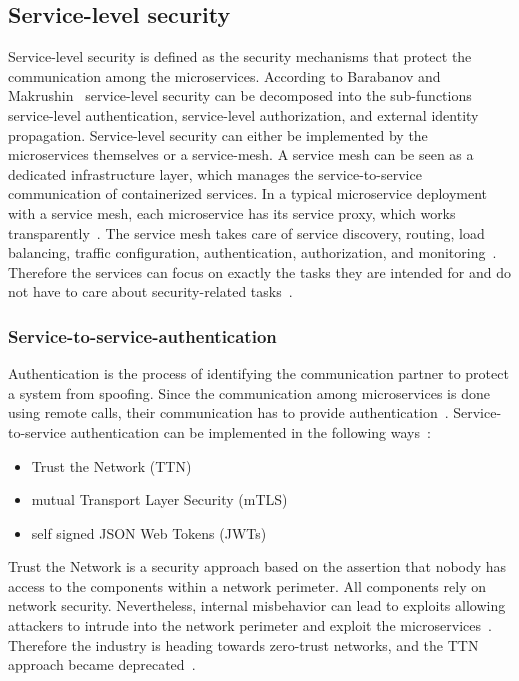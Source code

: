 \subsection{Service-level security}
Service-level security is defined as the security mechanisms that protect the communication among the microservices.
According to Barabanov and Makrushin~\cite{barabanov2020authentication} service-level security can be decomposed into the sub-functions service-level authentication, service-level authorization, and external identity propagation.
Service-level security can either be implemented by the microservices themselves or a service-mesh.
A service mesh can be seen as a dedicated infrastructure layer, which manages the service-to-service communication of containerized services.
In a typical microservice deployment with a service mesh, each microservice has its service proxy, which works transparently~\cite{dias2020microservices}.
The service mesh takes care of service discovery, routing, load balancing, traffic configuration, authentication, authorization, and monitoring~\cite{chandramouli2019microservices}.
Therefore the services can focus on exactly the tasks they are intended for and do not have to care about security-related tasks~\cite{dias2020microservices}.

\subsubsection{Service-to-service-authentication} 
\label{sec:service-to-service-authentication}
Authentication is the process of identifying the communication partner to protect a system from spoofing.
Since the communication among microservices is done using remote calls, their communication has to provide authentication~\cite{dias2020microservices}.
Service-to-service authentication can be implemented in the following ways~\cite{dias2020microservices}:
\begin{itemize}
    \item Trust the Network (TTN)
    \item mutual Transport Layer Security (mTLS)
    \item self signed JSON Web Tokens (JWTs)
\end{itemize}
Trust the Network is a security approach based on the assertion that nobody has access to the components within a network perimeter.
All components rely on network security.
Nevertheless, internal misbehavior can lead to exploits allowing attackers to intrude into the network perimeter and exploit the microservices~\cite{zaheer2019eztrust}. 
Therefore the industry is heading towards zero-trust networks, and the TTN approach became deprecated~\cite{dias2020microservices}.

